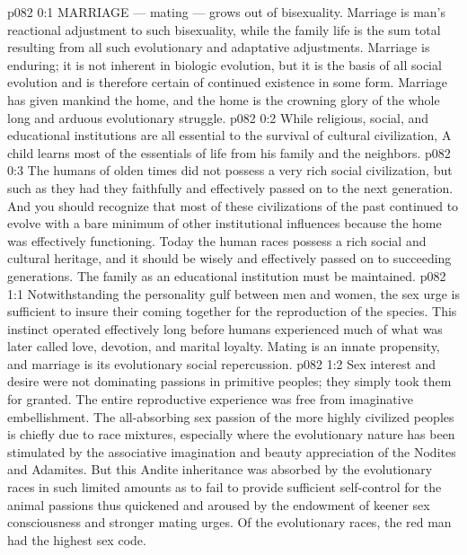\vs p082 0:1 MARRIAGE --- mating --- grows out of bisexuality. Marriage is man’s reactional adjustment to such bisexuality, while the family life is the sum total resulting from all such evolutionary and adaptative adjustments. Marriage is enduring; it is not inherent in biologic evolution, but it is the basis of all social evolution and is therefore certain of continued existence in some form. Marriage has given mankind the home, and the home is the crowning glory of the whole long and arduous evolutionary struggle.
\vs p082 0:2 While religious, social, and educational institutions are all essential to the survival of cultural civilization,  A child learns most of the essentials of life from his family and the neighbors.
\vs p082 0:3 The humans of olden times did not possess a very rich social civilization, but such as they had they faithfully and effectively passed on to the next generation. And you should recognize that most of these civilizations of the past continued to evolve with a bare minimum of other institutional influences because the home was effectively functioning. Today the human races possess a rich social and cultural heritage, and it should be wisely and effectively passed on to succeeding generations. The family as an educational institution must be maintained.
\vs p082 1:1 Notwithstanding the personality gulf between men and women, the sex urge is sufficient to insure their coming together for the reproduction of the species. This instinct operated effectively long before humans experienced much of what was later called love, devotion, and marital loyalty. Mating is an innate propensity, and marriage is its evolutionary social repercussion.
\vs p082 1:2 Sex interest and desire were not dominating passions in primitive peoples; they simply took them for granted. The entire reproductive experience was free from imaginative embellishment. The all\hyp{}absorbing sex passion of the more highly civilized peoples is chiefly due to race mixtures, especially where the evolutionary nature has been stimulated by the associative imagination and beauty appreciation of the Nodites and Adamites. But this Andite inheritance was absorbed by the evolutionary races in such limited amounts as to fail to provide sufficient self\hyp{}control for the animal passions thus quickened and aroused by the endowment of keener sex consciousness and stronger mating urges. Of the evolutionary races, the red man had the highest sex code.
